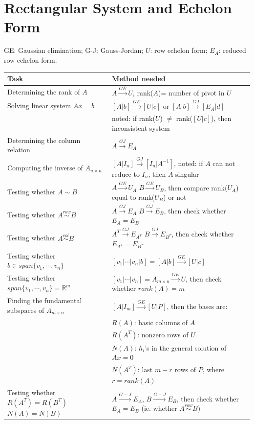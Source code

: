 \documentclass[10.5pt]{article}
\begin{document}
\section{Rectangular System and Echelon Form}
GE: Gaussian elimination; G-J: Gauss-Jordan; $U$: row echelon form; $E_A$: reduced row echelon form.
\begin{table}[H]
\centering
\begin{tabularx}{\textwidth}{X|X}
\hline
Task & Method needed \\ \hline
Determining the rank of $A$ & $A \xrightarrow{GE} U$, rank($A$)= number of pivot in $U$\\
Solving linear system $Ax=b$ & $[A|b]\xrightarrow{GE} [U|c]$ or $[A|b]\xrightarrow{GJ} [E_A|d]$ \\
 & noted: if rank($U$) $\neq$ rank($[U|c]$), then inconsistent system\\
Determining the column relation & $A\xrightarrow{GJ} E_A$\\
Computing the inverse of $A_{n\times n}$ & $[A|I_n]\xrightarrow{GJ} [I_n|A^{-1}]$, noted: if $A$ can not reduce to $I_n$, then $A$ singular\\
Testing whether $A \sim B$ & $A \xrightarrow{GE} U_A$ $B \xrightarrow{GE} U_B$, then compare rank($U_A$) equal to rank($U_B$) or not\\
Testing whether $A \overset{row}{\sim} B$ & $A \xrightarrow{GJ} E_A$ $B \xrightarrow{GJ} E_B$, then check whether $E_A=E_B$\\
Testing whether $A \overset{col}{\sim} B$ & $A^T \xrightarrow{GJ} E_{A^T}$ $B \xrightarrow{GJ} E_{B^T}$, then check whether $E_{A^T}=E_{B^T}$\\
Testing whether $b \in span\{v_1,\cdots,v_n\}$ & $[v_1|\cdots|v_n|b]=[A|b]\xrightarrow{GE} [U|c]$\\
Testing whether $span\{v_1,\cdots ,v_n\}=\mathbb{R}^m$ & $[v_1|\cdots |v_n]=A_{m\times n}\xrightarrow{GE}U$, then check whether $rank(A)=m$\\
Finding the fundamental subspaces of $A_{m\times n}$ & $[A|I_m]\xrightarrow{GE}[U|P]$, then the bases are:\\
~ & $R(A)$: basic columns of $A$\\
~ & $R(A^T)$: nonzero rows of $U$\\
~ & $N(A)$: $h_i$'s in the general solution of $Ax=0$\\
~ & $N(A^T)$: last $m-r$ rows of $P$, where $r=rank(A)$\\
Testing whether $R(A^T)=R(B^T)$ $N(A)=N(B)$ & $A\xrightarrow{G-J}E_A$, $B\xrightarrow{G-J}E_B$, then check whether $E_A=E_B$ (ie. whether $A\overset{row}{\sim}B$)\\

\end{tabularx}
\end{table}
\end{document}
